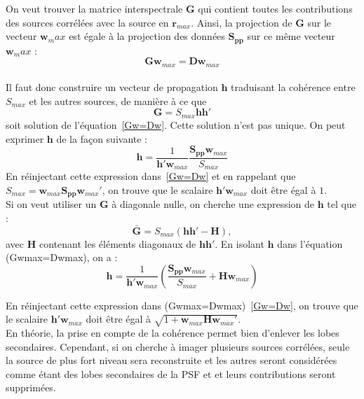 On veut trouver la matrice interspectrale $\bm{G}$ qui contient toutes les contributions des sources corrélées avec la source en $\bm{r}_{max}$. Ainsi, la projection de $\bm{G}$ sur le vecteur $\bm{w}_max$ est égale à la projection des données $\bm{S_{pp}}$ sur ce même vecteur $\bm{w}_max$ : \\
\begin{equation}\label{Gw=Dw}
	\bm{G}\bm{w}_{max}= \bm{D} \bm{w}_{max}
\end{equation}
\\

Il faut donc construire un vecteur de propagation $\bm{h}$ traduisant la cohérence entre $S_{max}$ et les autres sources, de manière à ce que 
\begin{equation}
	\bm{G} = S_{max} \bm{hh}'
\end{equation}
soit solution de l'équation~\ref{Gw=Dw}.
Cette solution n'est pas unique. On peut exprimer $\bm{h}$ de la façon suivante : 
\begin{equation}
	\bm{h}=\frac{1}{\bm{h}'\bm{w}_{max}}  \frac{\bm{S_{pp}}\bm{w}_{max}}{S_{max}}
\end{equation}
En réinjectant cette expression dans~\ref{Gw=Dw} et en rappelant que $S_{max} = \bm{w}_{max}\bm{S_{pp}}\bm{w}_{max}'$, on trouve que le scalaire $\bm{h}'\bm{w}_{max}$ doit être égal à $1$.\\

Si on veut utiliser un $\bm{G}$ à diagonale nulle, on cherche une expression de $\bm{h}$ tel que : 
\begin{equation}
	\bar{\bm{G}} = S_{max} (\bm{hh}'-\bm{H}),
\end{equation}
avec $\bm{H}$ contenant les éléments diagonaux de $\bm{hh}'$. En isolant $\bm{h}$ dans l'équation (Gwmax=Dwmax), on a : 
\begin{equation}
	\bm{h}=\frac{1}{\bm{h}'\bm{w}_{max}}  \left( \frac{\bm{S_{pp}}\bm{w}_{max}}{S_{max}} + \bm{H}\bm{w}_{max} \right)
\end{equation}

En réinjectant cette expression dans (Gwmax=Dwmax)~\ref{Gw=Dw}, on trouve que le scalaire $\bm{h}'\bm{w}_{max}$ doit être égal à $\sqrt{1+\bm{w}_{max}\bm{H}\bm{w}_{max}'}$.\\

En théorie, la prise en compte de la cohérence permet bien d'enlever les lobes secondaires. Cependant, si on cherche à imager plusieurs sources corrélées, seule la source de plus fort niveau sera reconstruite et les autres seront considérées comme étant des lobes secondaires de la PSF et et leurs contributions seront supprimées.







